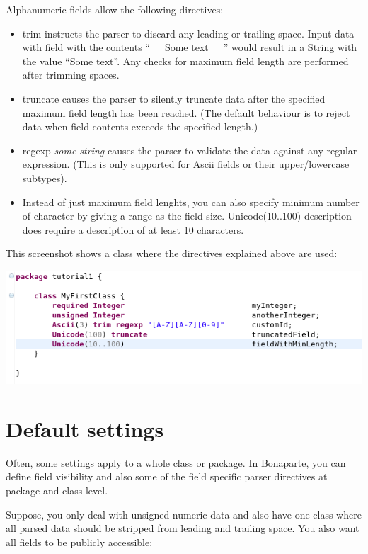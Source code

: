 \documentclass[11pt,a4paper,oneside]{article}
\begin{document}
Alphanumeric fields allow the following directives:
\begin{itemize}
  \item {\ttfamily trim} instructs the parser to discard any leading or trailing space. Input data with field with the contents ``\ \ \ Some text\ \ \  '' would result in a String with the
  value ``Some text''. Any checks for maximum field length are performed after trimming spaces.
  \item {\ttfamily truncate} causes the parser to silently truncate data after the specified maximum field length has been reached.
   (The default behaviour is to reject data when field contents exceeds the specified length.) 
   \item {\ttfamily regexp} {\it{some string}} causes the parser to validate the data against any regular expression. (This is only supported for
     {\ttfamily Ascii} fields or their upper/lowercase subtypes).
   \item Instead of just maximum field lenghts, you can also specify minimum number of character by giving a range as the field size.
    {\ttfamily Unicode(10..100) description} does require a description of at least 10 characters. 
\end{itemize}

This screenshot shows a class where the directives explained above are used:

\vspace{2mm}

\hspace{1cm}\includegraphics[scale=0.5]{images/tut1-005.png}
 
\section{Default settings}
Often, some settings apply to a whole class or package. 
In Bonaparte, you can define field visibility and also some of the field specific parser directives at package and class level.

Suppose, you only deal with unsigned numeric data and also have one class where all parsed data should be stripped from leading and trailing space.
You also want all fields to be publicly accessible:
\end{document}
